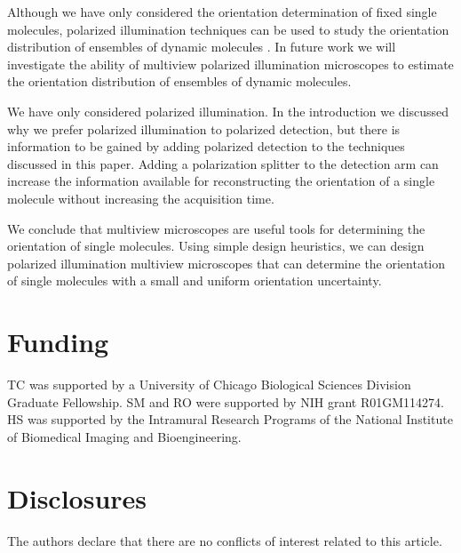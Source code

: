 \documentclass[10pt]{article}
\begin{document}
Although we have only considered the orientation determination of fixed single
molecules, polarized illumination techniques can be used to study the
orientation distribution of ensembles of dynamic molecules \cite{mehta2016,
  backer2016}. In future work we will investigate the ability of multiview
polarized illumination microscopes to estimate the orientation distribution of
ensembles of dynamic molecules.

We have only considered polarized illumination. In the introduction
we discussed why we prefer polarized illumination to polarized detection, but
there is information to be gained by adding polarized detection to the
techniques discussed in this paper. Adding a polarization splitter to the
detection arm can increase the information available for reconstructing the
orientation of a single molecule without increasing the acquisition time.

We conclude that multiview microscopes are useful tools for determining the
orientation of single molecules. Using simple design heuristics, we can design
polarized illumination multiview microscopes that can determine the orientation
of single molecules with a small and uniform orientation uncertainty.

\section*{Funding}
TC was supported by a University of Chicago Biological Sciences Division
Graduate Fellowship. SM and RO were supported by NIH grant R01GM114274. HS was
supported by the Intramural Research Programs of the National Institute of
Biomedical Imaging and Bioengineering.

\section*{Disclosures}
The authors declare that there are no conflicts of interest related to this article.
\end{document}
